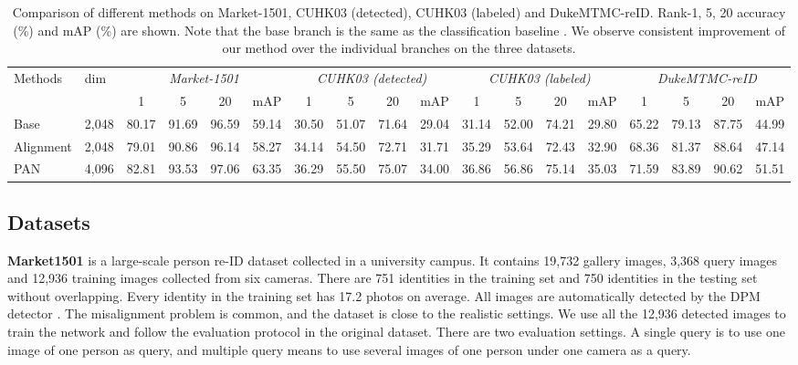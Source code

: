 \begin{table*}[t]
\setlength{\tabcolsep}{2.8pt}
\begin{center}
\begin{tabular}{l|l|cccc|cccc|cccc|cccc}\hline
\multirow{2}{*}{Methods}& \multirow{2}{*}{dim} & \multicolumn{4}{c|}{\emph{Market-1501}}   & \multicolumn{4}{c|}{\emph{CUHK03 (detected)}} &\multicolumn{4}{c|}{\emph{CUHK03 (labeled)}} &\multicolumn{4}{c}{\emph{DukeMTMC-reID}} \\\cline{3-18}
& & 1 & 5 & 20 &mAP & 1 & 5 & 20 & mAP & 1 & 5 & 20& mAP & 1 & 5 & 20 & mAP\\
\hline
Base &2,048 & 80.17 & 91.69 & 96.59 & 59.14 & 30.50 & 51.07 & 71.64 & 29.04 & 31.14 & 52.00 & 74.21 & 29.80 & 65.22 & 79.13 & 87.75 & 44.99 \\
 Alignment & 2,048 &79.01 & 90.86 & 96.14 & 58.27
 & 34.14 & 54.50 & 72.71 & 31.71
 & 35.29 & 53.64 & 72.43 & 32.90 
 & 68.36 & 81.37 & 88.64 & 47.14\\
\hline
 PAN & 4,096 & 82.81 & 93.53 & 97.06 & 63.35 
 & 36.29 & 55.50 & 75.07 & 34.00 
 & 36.86 & 56.86 & 75.14 & 35.03
 & 71.59 & 83.89 & 90.62 & 51.51\\
\hline
\end{tabular}
\end{center}
\caption{Comparison of different methods on Market-1501, CUHK03 (detected), CUHK03 (labeled) and DukeMTMC-reID. Rank-1, 5, 20 accuracy (\%) and mAP (\%) are shown. Note that the base branch is the same as the classification baseline \cite{zheng2016survey}. We observe consistent improvement of our method over the individual branches on the three datasets.}
\label{table:multi-dataset}
\end{table*}

\subsection{Datasets}
\textbf{Market1501} is a large-scale person re-ID dataset collected in a university campus. It contains 19,732 gallery images, 3,368 query images and 12,936 training images collected from six cameras. There are 751 identities in the training set and 750 identities in the testing set without overlapping. Every identity in the training set has 17.2 photos on average. All images are automatically detected by the DPM detector \cite{felzenszwalb2008discriminatively}. The misalignment problem is common, and the dataset is close to the realistic settings. We use all the 12,936 detected images to train the network and follow the evaluation protocol in the original dataset. There are two evaluation settings. A single query is to use one image of one person as query, and multiple query means to use several images of one person under one camera as a query.

